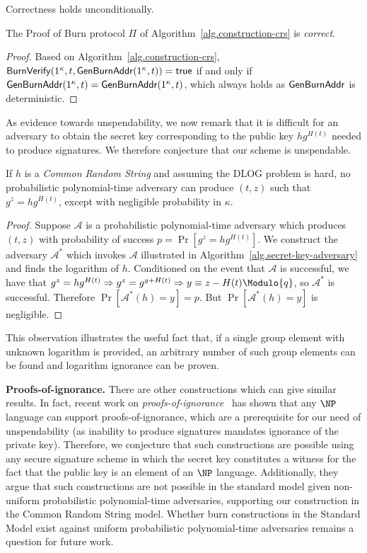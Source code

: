 Correctness holds unconditionally.

\begin{theorem}[Correctness]
  The Proof of Burn protocol $\Pi$ of Algorithm~\ref{alg.construction-crs} is \emph{correct}.
\end{theorem}
\begin{proof}
  Based on Algorithm~\ref{alg.construction-crs}, $\mathsf{BurnVerify}(1^\kappa, t, \mathsf{Gen}\-\mathsf{Burn}\-\mathsf{Addr}(1^\kappa, t)) = \textsf{true}$ if and only if $\mathsf{Gen}\-\mathsf{Burn}\-\mathsf{Addr}(1^\kappa, t) = \mathsf{Gen}\-\mathsf{Burn}\-\mathsf{Addr}(1^\kappa, t)$, which always holds as $\mathsf{Gen}\-\mathsf{Burn}\-\mathsf{Addr}$ is deterministic.
\end{proof}

As evidence towards unspendability, we now remark that it is difficult for an adversary to obtain the secret key corresponding to the public key $h g^{H(t)}$ needed to produce signatures. We therefore conjecture that our scheme is unspendable.

\begin{lemma}
  If $h$ is a \emph{Common Random String} and assuming the DLOG problem is hard, no probabilistic polynomial-time adversary can produce $(t, z)$ such that $g^z = h g^{H(t)}$, except with negligible probability in $\kappa$.
\end{lemma}
\begin{proof}
  Suppose $\mathcal{A}$ is a probabilistic polynomial-time adversary which produces $(t, z)$ with probability of success $p = \Pr[g^z = h g^{H(t)}]$.
  We construct the adversary $\mathcal{A}^*$ which invokes $\mathcal{A}$
  illustrated in Algorithm~\ref{alg.secret-key-adversary} and finds the
  logarithm of $h$.
  Conditioned on the event that $\mathcal{A}$ is successful,
  we have that
  $g^z = h g^{H(t)} \Rightarrow g^z = g^{y + H(t)} \Rightarrow y \equiv z - H(t) \Modulo{q}$, so $\mathcal{A}^*$ is successful.
  Therefore $\Pr[\mathcal{A}^*(h) = y] = p$.
  But $\Pr[\mathcal{A}^*(h) = y]$ is negligible.
\end{proof}

This observation illustrates the useful fact that, if a single group element with unknown logarithm is provided, an arbitrary number of such group elements can be found and logarithm ignorance can be proven.

\noindent\textbf{Proofs-of-ignorance.}
There are other constructions which can give similar results. In fact, recent
work on \emph{proofs-of-ignorance}~\cite{deshpande2018proofs} has shown that any
$\NP$ language can support proofs-of-ignorance, which are a prerequisite for our
need of unspendability (as inability to produce signatures mandates ignorance of
the private key). Therefore, we conjecture that such constructions
are possible using any secure signature scheme in which the secret key
constitutes a witness for the fact that the public key is an element of an $\NP$
language. Additionally, they argue that such constructions are not possible in
the standard model given non-uniform probabilistic polynomial-time adversaries,
supporting our construction in the Common Random String model. Whether burn
constructions in the Standard Model exist against uniform probabilistic
polynomial-time adversaries remains a question for future work.

